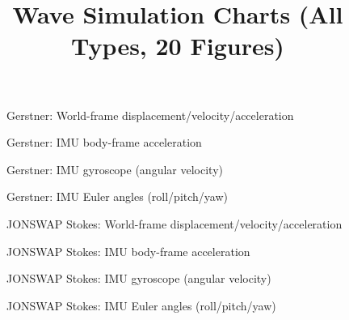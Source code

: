 \documentclass[11pt,letterpaper]{article}
\title{Wave Simulation Charts (All Types, 20 Figures)}
\author{}
\date{}
\begin{document}
\maketitle

\begin{figure}[H]\centering
  \resizebox{\textwidth}{!}{}
  \caption{Gerstner: World-frame displacement/velocity/acceleration}
  \label{fig:gerstner_world}
\end{figure}
\clearpage

\begin{figure}[H]\centering
  \resizebox{\textwidth}{!}{}
  \caption{Gerstner: IMU body-frame acceleration}
  \label{fig:gerstner_imu_accel}
\end{figure}
\clearpage

\begin{figure}[H]\centering
  \resizebox{\textwidth}{!}{}
  \caption{Gerstner: IMU gyroscope (angular velocity)}
  \label{fig:gerstner_imu_gyro}
\end{figure}
\clearpage

\begin{figure}[H]\centering
  \resizebox{\textwidth}{!}{}
  \caption{Gerstner: IMU Euler angles (roll/pitch/yaw)}
  \label{fig:gerstner_euler}
\end{figure}
\clearpage

\begin{figure}[H]\centering
  \resizebox{\textwidth}{!}{}
  \caption{JONSWAP Stokes: World-frame displacement/velocity/acceleration}
  \label{fig:jonswap_world}
\end{figure}
\clearpage

\begin{figure}[H]\centering
  \resizebox{\textwidth}{!}{}
  \caption{JONSWAP Stokes: IMU body-frame acceleration}
  \label{fig:jonswap_imu_accel}
\end{figure}
\clearpage

\begin{figure}[H]\centering
  \resizebox{\textwidth}{!}{}
  \caption{JONSWAP Stokes: IMU gyroscope (angular velocity)}
  \label{fig:jonswap_imu_gyro}
\end{figure}
\clearpage

\begin{figure}[H]\centering
  \resizebox{\textwidth}{!}{}
  \caption{JONSWAP Stokes: IMU Euler angles (roll/pitch/yaw)}
  \label{fig:jonswap_euler}
\end{figure}
\clearpage
\end{document}
